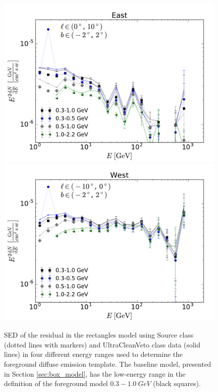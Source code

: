 \begin{figure}[h]
\centering
\includegraphics[width=\twopic\textwidth]{plots/SED_different_lowE_ranges_boxes_l=5_b=0.pdf}
\includegraphics[width=\twopic\textwidth]{plots/SED_different_lowE_ranges_boxes_l=-5_b=0.pdf}
\caption{SED of the residual in the rectangles model using Source class (dotted lines with markers) and UltraCleanVeto class data (solid lines) 
in four different energy ranges used to determine the foreground diffuse emission template. 
The baseline model, presented in Section \ref{sec:box_model}, has the low-energy range in the definition of the foreground model
$0.3 - \SI{1.0}{GeV}$ (black squares).}
\label{fig:syst_models}
\end{figure}

